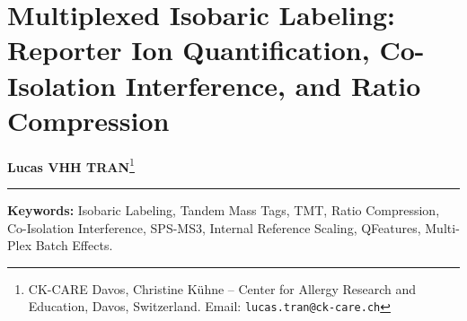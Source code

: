 \documentclass[11pt,oneside]{book}
\begin{document}
\setcounter{chapter}{14}
\chapter{Multiplexed Isobaric Labeling: Reporter Ion Quantification, Co-Isolation Interference, and Ratio Compression}

\noindent
\textbf{Lucas VHH TRAN}\footnote{CK-CARE Davos, Christine K\"uhne -- Center for Allergy Research and Education, Davos, Switzerland. Email: \texttt{lucas.tran@ck-care.ch}}\\
\rule{\textwidth}{0.8pt}

\begin{abstract}
\noindent
Isobaric chemical labeling strategies---predominantly Tandem Mass Tags (TMT) and Isobaric Tags for Relative and Absolute Quantitation (iTRAQ)---represent the cornerstone of high-throughput multiplexed quantitative proteomics. By conjugating mass-balanced chemical reagents to primary peptide amines, up to eighteen distinct biological specimens can be pooled and simultaneously analyzed within a single LC-MS/MS injection. The principal operational advantage is exceptional sample multiplexing throughput, accompanied by virtually complete data matrices across multiplexed channels.

However, the physical mechanism of MS2-based reporter ion generation harbors an insidious systematic artifact known as \textit{ratio compression}. Co-isolation of multiple precursor ions within the finite quadrupolar isolation window contaminates the reporter ion signal with near-uniform background ion fragments, artificially dampening observed biological fold changes toward unity. This chapter establishes the mathematical, physicochemical, and computational foundations required to rigorously audit, normalize, and analyze isobaric proteomics data. We derive the analytical formulation of precursor interference and ratio compression, formulate the purity correction estimator, and analyze multi-batch Internal Reference Scaling (IRS). We operationalize the complete statistical pipeline using the \texttt{QFeatures} and \texttt{limma} frameworks on benchmark known-ratio data (PXD000001). The chapter concludes with an audit of the five deadly sins of isobaric quantification, multi-tier exercises, and exhaustive step-by-step worked-out solutions.
\end{abstract}

\noindent
\textbf{Keywords:} Isobaric Labeling, Tandem Mass Tags, TMT, Ratio Compression, Co-Isolation Interference, SPS-MS3, Internal Reference Scaling, QFeatures, Multi-Plex Batch Effects.
\end{document}
